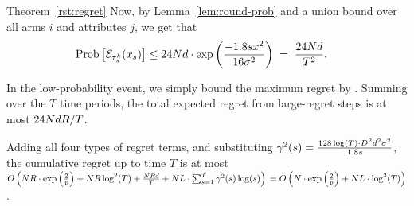 \begin{emptyextraproof}{Theorem~\ref{rst:regret}}
Now, by Lemma~\ref{lem:round-prob} and a union bound over all arms $i$
and attributes $j$, we get that 
\begin{align*}
\Prob{\AccEU{\tau_s^k}{x_s}}
& \leq 24 \ARMNUM d \cdot \exp \left( \frac{-1.8 s x^2}{16 \sigma^2} \right)
\; = \; \frac{24 \ARMNUM d}{T^2}.
\end{align*}

In the low-probability event, we simply 
bound the maximum regret by \MAXR.
Summing over the $T$ time periods,
the total expected regret from large-regret steps is at most
$24 N d R / T$.

Adding all four types of regret terms,
and substituting 
$\EarlyCut[2]{s} = \frac{128\log(T) \cdot \Diam^2 d^2 \sigma^2}{1.8 s}$,
the cumulative regret up to time $T$ is at most
$
O \left(\ARMNUM \MAXR \cdot \exp \left( \frac{2}{p} \right)
+ \ARMNUM \MAXR \log^2(T)
+ \frac{\ARMNUM \MAXR d}{T}
+ \ARMNUM \TieDensity \cdot \sum_{s=1}^{T} \EarlyCut[2]{s} \log(s) \right)\\
= 
O \left(\ARMNUM  \cdot \exp \left( \frac{2}{p} \right)
+ \ARMNUM \TieDensity \cdot \log^3(T) \right)$.\QED
\end{emptyextraproof}
